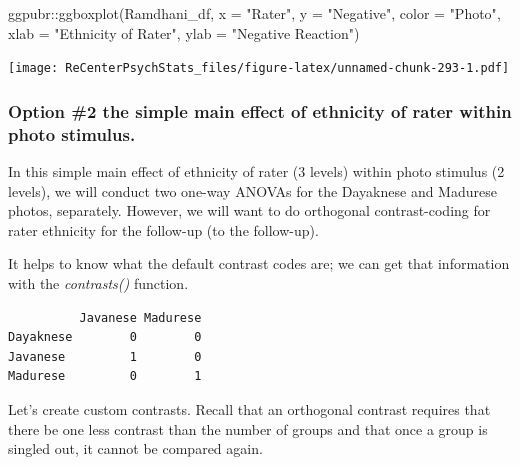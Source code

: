\documentclass[
  11pt,
]{book}
\newenvironment{Shaded}{\begin{snugshade}}{\end{snugshade}}
\newcommand{\AttributeTok}[1]{\textcolor[rgb]{0.77,0.63,0.00}{#1}}
\newcommand{\FunctionTok}[1]{\textcolor[rgb]{0.00,0.00,0.00}{#1}}
\newcommand{\NormalTok}[1]{#1}
\newcommand{\SpecialCharTok}[1]{\textcolor[rgb]{0.00,0.00,0.00}{#1}}
\newcommand{\StringTok}[1]{\textcolor[rgb]{0.31,0.60,0.02}{#1}}
\begin{document}
\begin{Shaded}
\begin{Highlighting}[]
\NormalTok{ggpubr}\SpecialCharTok{::}\FunctionTok{ggboxplot}\NormalTok{(Ramdhani\_df, }\AttributeTok{x =} \StringTok{"Rater"}\NormalTok{, }\AttributeTok{y =} \StringTok{"Negative"}\NormalTok{, }\AttributeTok{color =} \StringTok{"Photo"}\NormalTok{,}
    \AttributeTok{xlab =} \StringTok{"Ethnicity of Rater"}\NormalTok{, }\AttributeTok{ylab =} \StringTok{"Negative Reaction"}\NormalTok{)}
\end{Highlighting}
\end{Shaded}

\texttt{[image: ReCenterPsychStats\_files/figure-latex/unnamed-chunk-293-1.pdf]}

\hypertarget{option-2-the-simple-main-effect-of-ethnicity-of-rater-within-photo-stimulus.}{%
\subsubsection{Option \#2 the simple main effect of ethnicity of rater within photo stimulus.}\label{option-2-the-simple-main-effect-of-ethnicity-of-rater-within-photo-stimulus.}}

In this simple main effect of ethnicity of rater (3 levels) within photo stimulus (2 levels), we will conduct two one-way ANOVAs for the Dayaknese and Madurese photos, separately. However, we will want to do orthogonal contrast-coding for rater ethnicity for the follow-up (to the follow-up).

It helps to know what the default contrast codes are; we can get that information with the \emph{contrasts()} function.

\begin{Shaded}
\end{Shaded}

\begin{verbatim}
          Javanese Madurese
Dayaknese        0        0
Javanese         1        0
Madurese         0        1
\end{verbatim}

Let's create custom contrasts. Recall that an orthogonal contrast requires that there be one less contrast than the number of groups and that once a group is singled out, it cannot be compared again.
\end{document}
